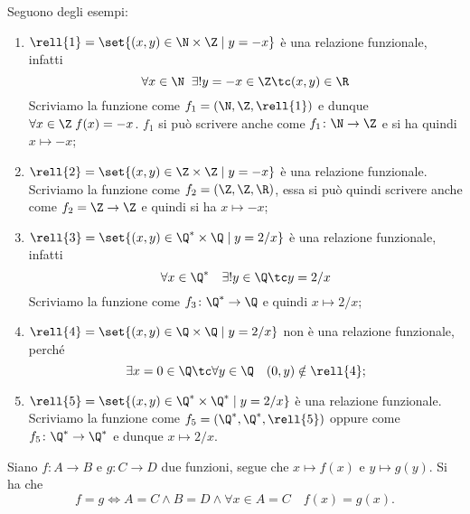 \begin{examples}
    Seguono degli esempi:
    \begin{enumerate}
        \item \(\rell{1} = \set{(x, y) \in \N \times \Z \mid y = -x}\) è una relazione funzionale, infatti
            \[
                \forall x \in \N \;\; \exists! y = -x \in \Z \tc (x, y) \in \R
            \]
            Scriviamo la funzione come \(f_1 = (\N, \Z, \rell{1})\) e dunque \(\forall x \in \Z \; f(x) = -x\).
            \(f_1\) si può scrivere anche come \(f_1 \colon \N \to \Z\) e si ha quindi \(x \mapsto -x\);
%
        \item \(\rell{2} = \set{(x, y) \in \Z \times \Z \mid y = -x}\) è una relazione funzionale. \\
            Scriviamo la funzione come \(f_2 = (\Z, \Z, \R)\), essa si può quindi scrivere anche come \(f_2 = \Z \to \Z\) e quindi si ha \(x \mapsto -x\);
%
        \item \(\rell{3} = \set{(x, y) \in \Q^* \times \Q \mid y = 2/x}\) è una relazione funzionale, infatti
            \[
                \forall x \in \Q^* \quad \exists! y \in \Q \tc y = 2/x
            \]
            Scriviamo la funzione come \(f_3 \colon \Q^* \to \Q\) e quindi \(x \mapsto 2/x\);
%
        \item \(\rell{4} = \set{(x, y) \in \Q \times \Q \mid y = 2/x}\) non è una relazione funzionale, perché
            \[
                \exists x = 0 \in \Q \tc \forall y \in \Q \quad (0, y) \notin \rell{4};
            \]
%
        \item \(\rell{5} = \set{(x, y) \in \Q^* \times \Q^* \mid y = 2/x}\) è una relazione funzionale. Scriviamo la funzione come \(f_5 = (\Q^*, \Q^*, \rell{5})\) oppure come \(f_5 \colon \Q^* \to \Q^*\) e dunque \(x \mapsto 2/x\).
    \end{enumerate}
\end{examples}


\begin{remark}
    Siano \(f \colon A \to B\) e \(g \colon C \to D\) due funzioni, segue che \(x \mapsto f(x)\) e \(y \mapsto g(y)\). Si ha che
    \[
        f = g \Longleftrightarrow A = C \land B = D \land \forall x \in A = C \quad f(x) = g(x).
    \]
\end{remark}
